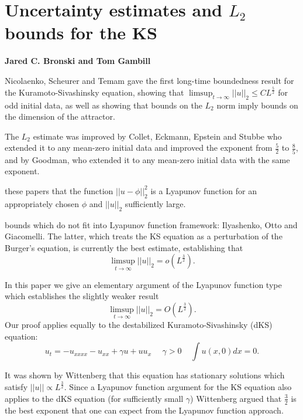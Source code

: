 
\section{Uncertainty estimates and $L_2$ bounds for the KS}

{\bf
Jared C. Bronski
and
Tom Gambill}


Nicolaenko, Scheurer and Temam gave the first long-time
boundedness result for the Kuramoto-Sivashinsky equation, showing
 that $\limsup_{t \rightarrow \infty} |\!|u|\!|_2
\le C L^{\frac{5}{2}}$
for odd initial data, as well as showing
that bounds on the $L_2$ norm imply bounds on the dimension of the attractor.

The $L_2$ estimate was improved by
Collet, Eckmann, Epstein and
Stubbe who  extended it to any mean-zero initial data and improved the exponent from
$\frac{5}{2}$ to $\frac{8}{5}$,
and by Goodman, who extended it to
any mean-zero initial data with the same exponent.

these papers that the function $|\!|u-\phi|\!|_2^2$ is a Lyapunov function for
an appropriately chosen $\phi$ and $|\!|u|\!|_2$ sufficiently large.

bounds which do not fit into Lyapunov function framework:
Ilyashenko,
Otto  and Giacomelli.
The latter, which treats the KS equation as a
perturbation of the Burger's equation, is currently the best estimate, establishing that
\[
\limsup_{t \rightarrow \infty} |\!|u|\!|_2 = o(L^{\frac{3}{2}}).
\]

In this paper we give an elementary argument of the Lyapunov function
type which establishes the slightly weaker result
\[
\limsup_{t \rightarrow \infty} |\!|u|\!|_2 = O(L^{\frac{3}{2}}).
\]
Our proof applies equally to the destabilized Kuramoto-Sivashinsky (dKS)
equation:
\[
u_t = -u_{xxxx} - u_{xx} + \gamma  u + u u_x ~~~~~~\gamma > 0 ~~~~~ \int u(x,0)dx = 0.
\]

It was shown by Wittenberg that this equation
has stationary solutions which satisfy $|\!|u|\!| \propto L^{\frac{3}{2}}.$
Since a Lyapunov function argument for the KS equation also applies
to the dKS equation (for sufficiently small $\gamma$) Wittenberg
argued that $\frac{3}{2}$ is the best exponent that one can expect
from the Lyapunov function approach.

